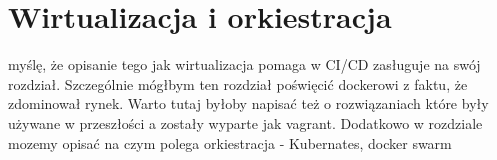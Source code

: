 \section{Wirtualizacja i orkiestracja}
myślę, że opisanie tego jak wirtualizacja pomaga w CI/CD zasługuje na swój rozdział. Szczególnie mógłbym ten rozdział poświęcić dockerowi z faktu, że zdominował rynek. Warto tutaj byłoby napisać też o rozwiązaniach które były używane w przeszłości a zostały wyparte jak vagrant. Dodatkowo w rozdziale mozemy opisać na czym polega orkiestracja - Kubernates, docker swarm